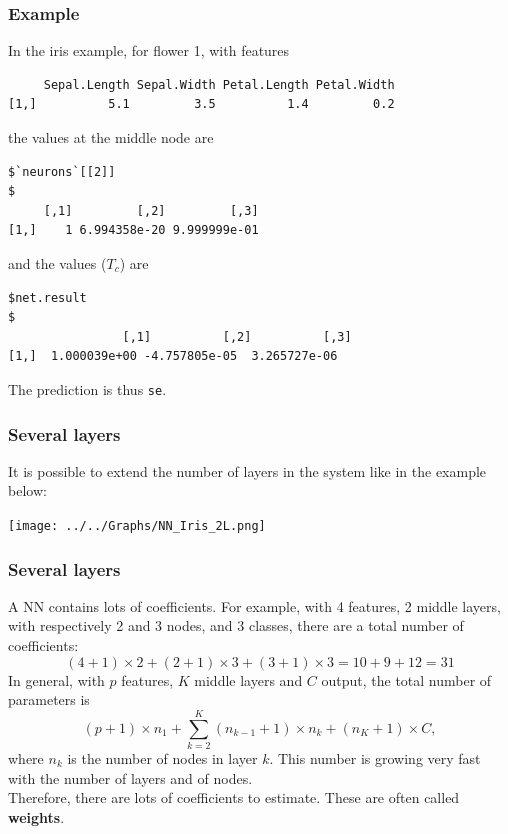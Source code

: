 \begin{frame}[fragile]
\frametitle{Example}
In the iris example, for flower 1, with features\\
\scriptsize
\begin{verbatim}
     Sepal.Length Sepal.Width Petal.Length Petal.Width
[1,]          5.1         3.5          1.4         0.2
\end{verbatim}
\normalsize
the values at the middle node are\\
\scriptsize
\begin{verbatim}
$`neurons`[[2]]                                                                         $
     [,1]         [,2]         [,3]
[1,]    1 6.994358e-20 9.999999e-01
\end{verbatim}
\normalsize
and the values ($T_c$) are\\ 
\scriptsize
\begin{verbatim}
$net.result                                                                            $
                [,1]          [,2]          [,3]
[1,]  1.000039e+00 -4.757805e-05  3.265727e-06
\end{verbatim}
\normalsize
The prediction is thus {\tt se}. 
\end{frame}
\begin{frame}
\frametitle{Several layers}
It is possible to extend the number of layers in the system like in the example below:
\begin{center}
\texttt{[image: ../../Graphs/NN\_Iris\_2L.png]}
\end{center}
\end{frame}
\begin{frame}
\frametitle{Several layers}
A NN contains lots of coefficients. For example, with 4 features, 2 middle layers, with respectively 2 and 3 nodes, and 3 classes, there are a total number of coefficients:
$$
(4+1)\times 2 + (2+1)\times 3 + (3+1) \times 3 = 10+9+12 = 31
$$
In general, with $p$ features, $K$ middle layers and $C$ output, the total number of parameters is
$$
(p+1)\times n_1 + \sum_{k=2}^K (n_{k-1}+1) \times n_k + (n_K+1)\times C,
$$
where $n_k$ is the number of nodes in layer $k$. This number is growing very fast with the number of layers and of nodes.\\
\vspace{0.2cm} 
Therefore, there are lots of coefficients to estimate. These are often called {\bf weights}.
\end{frame}
